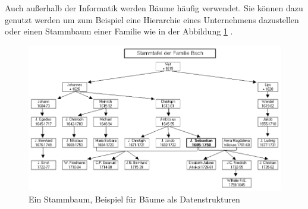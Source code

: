 Auch außerhalb der Informatik werden Bäume häufig verwendet. Sie können 
dazu genutzt werden um zum Beispiel eine Hierarchie eines Unternehmens
dazustellen oder einen Stammbaum einer 
Familie wie in der Abbildung \ref{pic:stammbaum} \cite[]{q4}.

\begin{figure}[h]
    \centering
    \includegraphics[scale=0.7]{abbildungen/Stammbaum.png}
    \caption{Ein Stammbaum, Beispiel für Bäume als Datenstrukturen \cite[]{q4}}
    \label{pic:stammbaum}
\end{figure}
